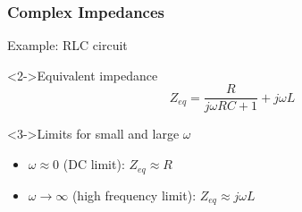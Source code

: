 \documentclass[beamer]{standalone}
\begin{document}
\begin{frame}
 \frametitle{Complex Impedances}
 \begin{block}{Example: RLC circuit}
  \begin{center}
  \end{center}
 \end{block}
 \begin{block}<2->{Equivalent impedance}
  \begin{equation*}
   Z_{eq} = \frac{R}{j \omega R C + 1} + j \omega L
  \end{equation*}
 \end{block}
 \begin{block}<3->{Limits for small and large $\omega$}
  \begin{itemize}
   \item $\omega \approx 0$ (DC limit): $Z_{eq} \approx R$
   \item $\omega \to \infty$ (high frequency limit): $Z_{eq} \approx j\omega L$
  \end{itemize}
 \end{block}
\end{frame}
\end{document}
